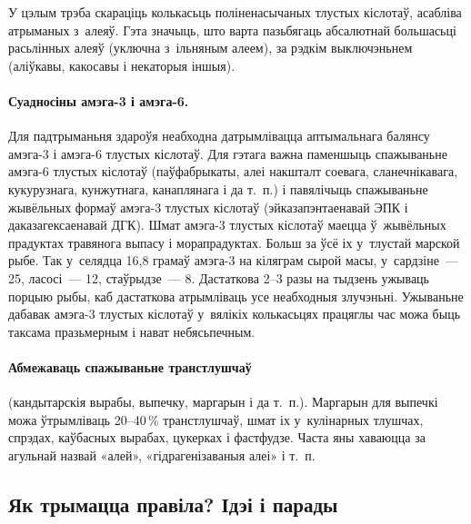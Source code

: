 
У цэлым трэба скараціць колькасьць поліненасычаных тлустых кіслотаў, асабліва атрыманых з~алеяў. Гэта значыць, што варта пазьбягаць абсалютнай большасьці расьлінных алеяў (уключна з~ільняным алеем), за рэдкім выключэньнем (аліўкавы, какосавы і некаторыя іншыя).

\paragraph{Суадносіны амэга-3 і амэга-6.}
Для падтрыманьня здароўя неабходна датрымлівацца аптымальнага балянсу амэга-3 і амэга-6 тлустых кіслотаў. Для гэтага важна паменшыць спажываньне амэга-6 тлустых кіслотаў (паўфабрыкаты, алеі накшталт соевага, сланечнікавага, кукурузнага, кунжутнага, канаплянага і да т.~п.) і павялічыць спажываньне жывёльных формаў амэга-3 тлустых кіслотаў (эйказапэнтаенавай ЭПК і даказагексаенавай ДГК). Шмат амэга-3 тлустых кіслотаў маецца ў~жывёльных прадуктах травянога выпасу і морапрадуктах. Больш за ўсё іх у~тлустай марской рыбе. Так у~селядца 16,8 грамаў амэга-3 на кіляграм сырой масы, у~сардзіне~--- 25, ласосі~--- 12, стаўрыдзе~--- 8. Дастаткова 2--3 разы на тыдзень ужываць порцыю рыбы, каб дастаткова атрымліваць усе неабходныя злучэньні. Ужываньне дабавак амэга-3 тлустых кіслотаў у~вялікіх колькасьцях працяглы час можа быць таксама празьмерным і нават небясьпечным.

\paragraph{Абмежаваць спажываньне транстлушчаў} (кандытарскія вырабы, выпечку, маргарын і да т.~п.).
Маргарын для выпечкі можа ўтрымліваць 20--40\,\% транстлушчаў, шмат іх у~кулінарных тлушчах, спрэдах, каўбасных вырабах, цукерках і фастфудзе. Часта яны хаваюцца за агульнай назвай «алей», «гідрагенізаваныя алеі» і т.~п.

\subsection{Як трымацца правіла? Ідэі і парады}

